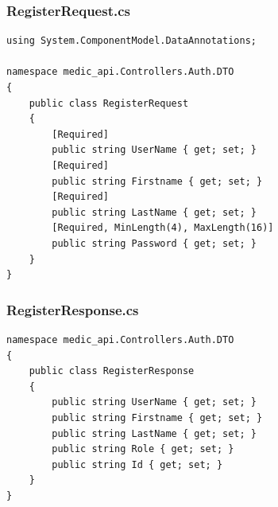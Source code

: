 \documentclass[12pt,a4paper]{article}
\begin{document}
	\subsubsection{RegisterRequest.cs}
	\begin{lstlisting}
using System.ComponentModel.DataAnnotations;

namespace medic_api.Controllers.Auth.DTO
{
    public class RegisterRequest
    {
        [Required]
        public string UserName { get; set; }
        [Required]
        public string Firstname { get; set; }
        [Required]
        public string LastName { get; set; }
        [Required, MinLength(4), MaxLength(16)]
        public string Password { get; set; }
    }
}
	\end{lstlisting}
	\subsubsection{RegisterResponse.cs}
	\begin{lstlisting}
namespace medic_api.Controllers.Auth.DTO
{
    public class RegisterResponse
    {
        public string UserName { get; set; }
        public string Firstname { get; set; }
        public string LastName { get; set; }
        public string Role { get; set; }
        public string Id { get; set; }
    }
}
	\end{lstlisting}
\end{document}
